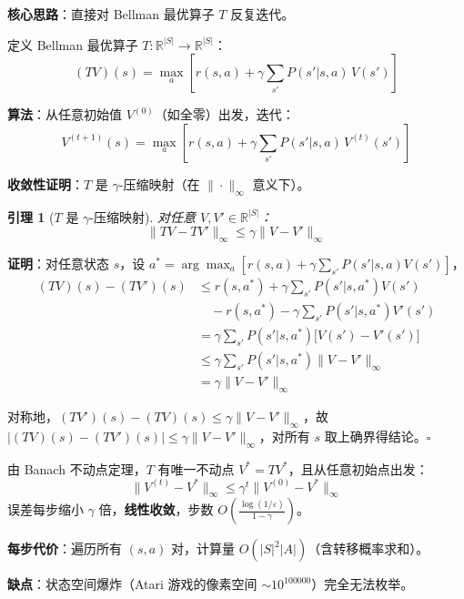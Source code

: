 \documentclass[12pt, a4paper]{ctexart}
\newtheorem{lemma}[theorem]{引理}
\begin{document}
\begin{blackboard}

\textbf{核心思路}：直接对 Bellman 最优算子 $T$ 反复迭代。

定义 Bellman 最优算子 $T: \mathbb{R}^{|S|} \to \mathbb{R}^{|S|}$：
\[
(TV)(s) = \max_a \left[ r(s,a) + \gamma \sum_{s'} P(s'|s,a)\, V(s') \right]
\]

\textbf{算法}：从任意初始值 $V^{(0)}$（如全零）出发，迭代：
\[
V^{(t+1)}(s) = \max_a \left[ r(s,a) + \gamma \sum_{s'} P(s'|s,a)\, V^{(t)}(s') \right]
\]

\textbf{收敛性证明}：$T$ 是 $\gamma$-压缩映射（在 $\|\cdot\|_\infty$ 意义下）。

\begin{lemma}[$T$ 是 $\gamma$-压缩映射]
对任意 $V, V' \in \mathbb{R}^{|S|}$：
\[
\|TV - TV'\|_\infty \leq \gamma \|V - V'\|_\infty
\]
\end{lemma}

\textbf{证明}：对任意状态 $s$，设 $a^* = \arg\max_a [r(s,a) + \gamma \sum_{s'} P(s'|s,a) V(s')]$，
\begin{align*}
(TV)(s) - (TV')(s)
&\leq r(s,a^*) + \gamma \sum_{s'} P(s'|s,a^*) V(s') \\
&\quad - r(s,a^*) - \gamma \sum_{s'} P(s'|s,a^*) V'(s') \\
&= \gamma \sum_{s'} P(s'|s,a^*) \bigl[V(s') - V'(s')\bigr] \\
&\leq \gamma \sum_{s'} P(s'|s,a^*) \|V - V'\|_\infty \\
&= \gamma \|V - V'\|_\infty
\end{align*}

对称地，$(TV')(s) - (TV)(s) \leq \gamma\|V-V'\|_\infty$，故 $|(TV)(s)-(TV')(s)| \leq \gamma\|V-V'\|_\infty$，对所有 $s$ 取上确界得结论。$\square$

由 Banach 不动点定理，$T$ 有唯一不动点 $V^* = TV^*$，且从任意初始点出发：
\[
\|V^{(t)} - V^*\|_\infty \leq \gamma^t \|V^{(0)} - V^*\|_\infty
\]
误差每步缩小 $\gamma$ 倍，\textbf{线性收敛}，步数 $O\!\left(\frac{\log(1/\varepsilon)}{1-\gamma}\right)$。

\textbf{每步代价}：遍历所有 $(s,a)$ 对，计算量 $O(|S|^2 |A|)$（含转移概率求和）。

\textbf{缺点}：状态空间爆炸（Atari 游戏的像素空间 $\sim 10^{100000}$）完全无法枚举。

\end{blackboard}
\end{document}
